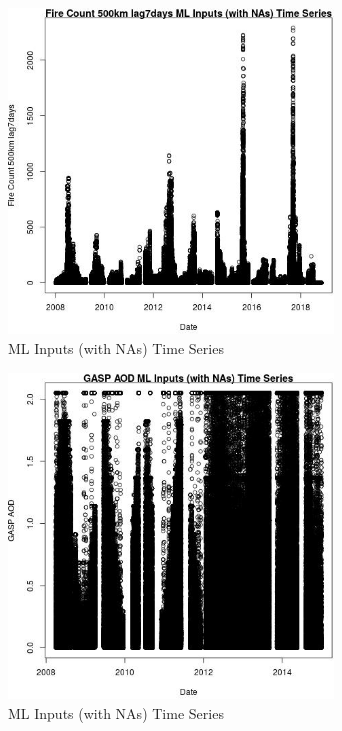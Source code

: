 \begin{figure} 
\centering  
\includegraphics[width=0.77\textwidth]{Code_Outputs/Report_ML_input_PM25_Step4_part_e_de_duplicated_aves_compiled_2019-05-20wNAs_Fire_Count_500km_lag7daysvDate.jpg} 
\caption{\label{fig:Report_ML_input_PM25_Step4_part_e_de_duplicated_aves_compiled_2019-05-20wNAsFire_Count_500km_lag7daysvDate}ML Inputs (with NAs) Time Series} 
\end{figure} 
 

\clearpage 

\begin{figure} 
\centering  
\includegraphics[width=0.77\textwidth]{Code_Outputs/Report_ML_input_PM25_Step4_part_e_de_duplicated_aves_compiled_2019-05-20wNAs_GASP_AODvDate.jpg} 
\caption{\label{fig:Report_ML_input_PM25_Step4_part_e_de_duplicated_aves_compiled_2019-05-20wNAsGASP_AODvDate}ML Inputs (with NAs) Time Series} 
\end{figure} 
 

